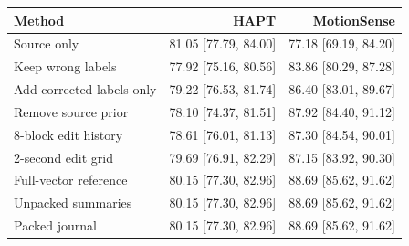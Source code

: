 \begin{tabular}{lrr}
\toprule
Method & HAPT & MotionSense \\
\midrule
Source only & 81.05 [77.79, 84.00] & 77.18 [69.19, 84.20] \\
Keep wrong labels & 77.92 [75.16, 80.56] & 83.86 [80.29, 87.28] \\
Add corrected labels only & 79.22 [76.53, 81.74] & 86.40 [83.01, 89.67] \\
Remove source prior & 78.10 [74.37, 81.51] & 87.92 [84.40, 91.12] \\
8-block edit history & 78.61 [76.01, 81.13] & 87.30 [84.54, 90.01] \\
2-second edit grid & 79.69 [76.91, 82.29] & 87.15 [83.92, 90.30] \\
Full-vector reference & 80.15 [77.30, 82.96] & 88.69 [85.62, 91.62] \\
Unpacked summaries & 80.15 [77.30, 82.96] & 88.69 [85.62, 91.62] \\
Packed journal & 80.15 [77.30, 82.96] & 88.69 [85.62, 91.62] \\
\bottomrule
\end{tabular}
